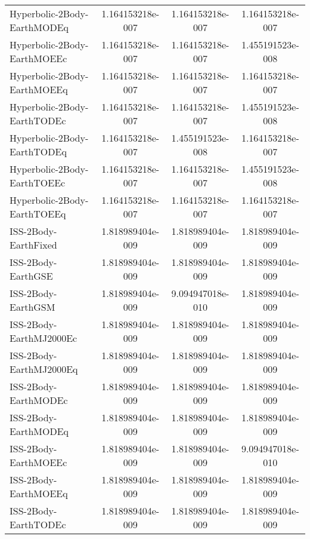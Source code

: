 \begin{table}[htbp!]
\begin{tabular}{lccc}
         Hyperbolic-2Body-EarthMODEq & 1.164153218e-007 & 1.164153218e-007 & 1.164153218e-007 \\
         Hyperbolic-2Body-EarthMOEEc & 1.164153218e-007 & 1.164153218e-007 & 1.455191523e-008 \\
         Hyperbolic-2Body-EarthMOEEq & 1.164153218e-007 & 1.164153218e-007 & 1.164153218e-007 \\
         Hyperbolic-2Body-EarthTODEc & 1.164153218e-007 & 1.164153218e-007 & 1.455191523e-008 \\
         Hyperbolic-2Body-EarthTODEq & 1.164153218e-007 & 1.455191523e-008 & 1.164153218e-007 \\
         Hyperbolic-2Body-EarthTOEEc & 1.164153218e-007 & 1.164153218e-007 & 1.455191523e-008 \\
         Hyperbolic-2Body-EarthTOEEq & 1.164153218e-007 & 1.164153218e-007 & 1.164153218e-007 \\
         ISS-2Body-EarthFixed & 1.818989404e-009 & 1.818989404e-009 & 1.818989404e-009 \\
         ISS-2Body-EarthGSE & 1.818989404e-009 & 1.818989404e-009 & 1.818989404e-009 \\
         ISS-2Body-EarthGSM & 1.818989404e-009 & 9.094947018e-010 & 1.818989404e-009 \\
         ISS-2Body-EarthMJ2000Ec & 1.818989404e-009 & 1.818989404e-009 & 1.818989404e-009 \\
         ISS-2Body-EarthMJ2000Eq & 1.818989404e-009 & 1.818989404e-009 & 1.818989404e-009 \\
         ISS-2Body-EarthMODEc & 1.818989404e-009 & 1.818989404e-009 & 1.818989404e-009 \\
         ISS-2Body-EarthMODEq & 1.818989404e-009 & 1.818989404e-009 & 1.818989404e-009 \\
         ISS-2Body-EarthMOEEc & 1.818989404e-009 & 1.818989404e-009 & 9.094947018e-010 \\
         ISS-2Body-EarthMOEEq & 1.818989404e-009 & 1.818989404e-009 & 1.818989404e-009 \\
         ISS-2Body-EarthTODEc & 1.818989404e-009 & 1.818989404e-009 & 1.818989404e-009 \\

\end{tabular}
\end{table}
